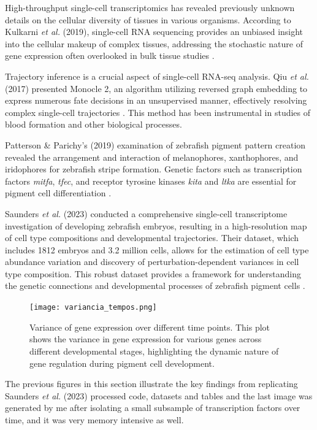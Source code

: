 \documentclass[runningheads]{llncs}
\begin{document}
High-throughput single-cell transcriptomics has revealed previously unknown details on the cellular diversity of tissues in various organisms. According to Kulkarni \textit{et al.} (2019), single-cell RNA sequencing provides an unbiased insight into the cellular makeup of complex tissues, addressing the stochastic nature of gene expression often overlooked in bulk tissue studies \cite{kulkarni2019beyond}.

Trajectory inference is a crucial aspect of single-cell RNA-seq analysis. Qiu \textit{et al.} (2017) presented Monocle 2, an algorithm utilizing reversed graph embedding to express numerous fate decisions in an unsupervised manner, effectively resolving complex single-cell trajectories \cite{qiu2017reversed}. This method has been instrumental in studies of blood formation and other biological processes.

Patterson \& Parichy's (2019) examination of zebrafish pigment pattern creation revealed the arrangement and interaction of melanophores, xanthophores, and iridophores for zebrafish stripe formation. Genetic factors such as transcription factors \textit{mitfa}, \textit{tfec}, and receptor tyrosine kinases \textit{kita} and \textit{ltka} are essential for pigment cell differentiation \cite{patterson2019zebrafish}.

Saunders \textit{et al.} (2023) conducted a comprehensive single-cell transcriptome investigation of developing zebrafish embryos, resulting in a high-resolution map of cell type compositions and developmental trajectories. Their dataset, which includes 1812 embryos and 3.2 million cells, allows for the estimation of cell type abundance variation and discovery of perturbation-dependent variances in cell type composition. This robust dataset provides a framework for understanding the genetic connections and developmental processes of zebrafish pigment cells \cite{saunders2023embryo}.

\begin{figure}[H]
  \centering
  \texttt{[image: variancia\_tempos.png]}
  \caption{Variance of gene expression over different time points. This plot shows the variance in gene expression for various genes across different developmental stages, highlighting the dynamic nature of gene regulation during pigment cell development.}
  \label{results 2}
\end{figure}

The previous figures in this section illustrate the key findings from replicating Saunders \textit{et al.} (2023) processed code, datasets and tables and the last image was generated by me after isolating a small subsample of transcription factors over time, and it was very memory intensive as well.
\end{document}
